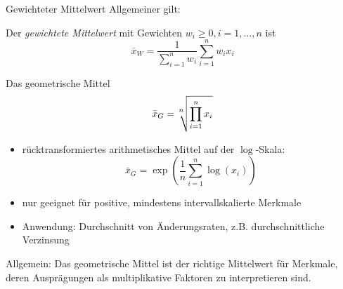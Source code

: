 \documentclass[
  10pt,
  ignorenonframetext,
]{beamer}
\providecommand{\tightlist}{%
  \setlength{\itemsep}{0pt}\setlength{\parskip}{0pt}}
\begin{document}
\begin{frame}{Gewichteter Mittelwert}
\label{gewichteter-mittelwert}
Allgemeiner gilt:

Der \emph{gewichtete Mittelwert} mit Gewichten
\(w_i \geq 0, i= 1, \dots, n\) ist
\[\bar x_W = \frac{1}{\sum^n_{i=1} w_i} \sum^n_{i=1} w_i x_i\]
\end{frame}

\begin{frame}{Das geometrische Mittel}
\label{das-geometrische-mittel}
\begin{equation*}
      \bar x_G = \sqrt[\leftroot{2}\uproot{2} \text{\scriptsize $n$}]{\prod_{i=1}^n x_i}
\end{equation*}

\begin{itemize}
\tightlist
\item
  rücktransformiertes arithmetisches Mittel auf der \(\log\)-Skala:
  \begin{displaymath}
    \bar x_G = \exp \left(\frac{1}{n}\sum_{i=1}^{n} \log (x_{i})\right)
    \end{displaymath}
\item
  nur geeignet für positive, mindestens intervallskalierte Merkmale
\item
  Anwendung: Durchschnitt von Änderungsraten, z.B. durchschnittliche
  Verzinsung
\end{itemize}

Allgemein: Das geometrische Mittel ist der richtige Mittelwert für
Merkmale, deren Ausprägungen als multiplikative Faktoren zu
interpretieren sind.
\end{frame}
\end{document}
